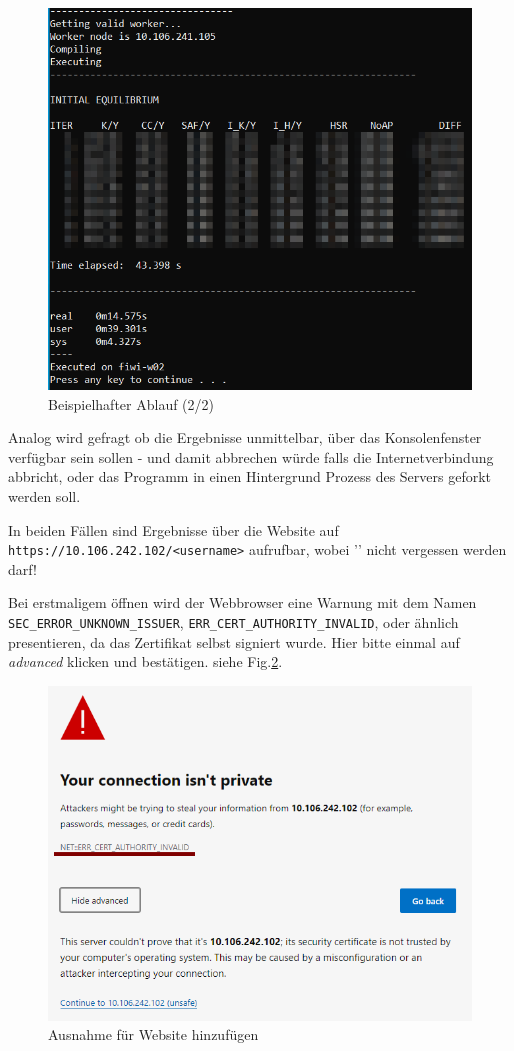 \documentclass[11pt, a4paper]{article}
\begin{document}
\begin{figure}[h]
    \centering
    \includegraphics[width=0.7\linewidth]{./pics/2022-03-09_00-05.png}
    \caption{Beispielhafter Ablauf (2/2)}
    \label{fig:usage-full}
\end{figure}

Analog wird gefragt ob die Ergebnisse unmittelbar, über das Konsolenfenster verfügbar sein sollen - und damit abbrechen würde falls die Internetverbindung abbricht, oder das Programm in einen Hintergrund Prozess des Servers geforkt werden soll.

In beiden Fällen sind Ergebnisse über die Website auf \texttt{https://10.106.242.102/\raisebox{0.5ex}{\texttildelow}<username>} aufrufbar, wobei '\texttt{\raisebox{0.5ex}{\texttildelow}}' nicht vergessen werden darf!

Bei erstmaligem öffnen wird der Webbrowser eine Warnung mit dem Namen \texttt{SEC\_ERROR\_UNKNOWN\_ISSUER}, \texttt{ERR\_CERT\_AUTHORITY\_INVALID}, oder ähnlich presentieren, da das Zertifikat selbst signiert wurde.
Hier bitte einmal auf \emph{advanced} klicken und bestätigen.
siehe Fig.\ref{fig:web-1}.

\begin{figure}[h]
    \centering
    \includegraphics[width=0.7\linewidth]{./pics/2022-03-09_01-03_1.png}
    \caption{Ausnahme für Website hinzufügen}
    \label{fig:web-1}
\end{figure}
\end{document}
